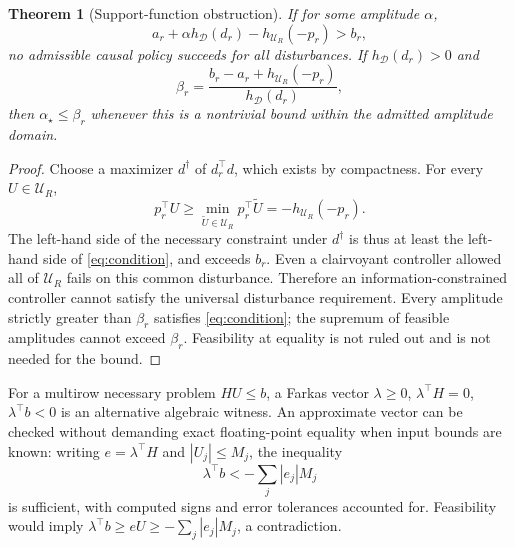 \documentclass[11pt]{article}
\newtheorem{theorem}{Theorem}
\newcommand{\astar}{\alpha_\star}
\begin{document}
\begin{theorem}[Support-function obstruction]\label{thm:upper}
If for some amplitude $\alpha$,
\begin{equation}
a_r+\alpha h_{\mathcal D}(d_r)-h_{\mathcal U_R}(-p_r)>b_r,
\label{eq:condition}
\end{equation}
no admissible causal policy succeeds for all disturbances. If $h_{\mathcal D}(d_r)>0$ and
\begin{equation}
\beta_r=\frac{b_r-a_r+h_{\mathcal U_R}(-p_r)}{h_{\mathcal D}(d_r)},
\end{equation}
then $\astar\leq\beta_r$ whenever this is a nontrivial bound within the admitted amplitude domain.
\end{theorem}
\begin{proof}
Choose a maximizer $d^\dagger$ of $d_r^\top d$, which exists by compactness. For every $U\in\mathcal U_R$,
\begin{equation}
p_r^\top U\geq\min_{\widetilde U\in\mathcal U_R}p_r^\top\widetilde U=-h_{\mathcal U_R}(-p_r).
\end{equation}
The left-hand side of the necessary constraint under $d^\dagger$ is thus at least the left-hand side of \eqref{eq:condition}, and exceeds $b_r$. Even a clairvoyant controller allowed all of $\mathcal U_R$ fails on this common disturbance. Therefore an information-constrained controller cannot satisfy the universal disturbance requirement. Every amplitude strictly greater than $\beta_r$ satisfies \eqref{eq:condition}; the supremum of feasible amplitudes cannot exceed $\beta_r$. Feasibility at equality is not ruled out and is not needed for the bound.
\end{proof}

For a multirow necessary problem $HU\leq b$, a Farkas vector $\lambda\geq0$, $\lambda^\top H=0$, $\lambda^\top b<0$ is an alternative algebraic witness. An approximate vector can be checked without demanding exact floating-point equality when input bounds are known: writing $e=\lambda^\top H$ and $|U_j|\leq M_j$, the inequality
\begin{equation}
\lambda^\top b< -\sum_j |e_j|M_j
\end{equation}
is sufficient, with computed signs and error tolerances accounted for. Feasibility would imply $\lambda^\top b\geq eU\geq-\sum_j|e_j|M_j$, a contradiction.
\end{document}
